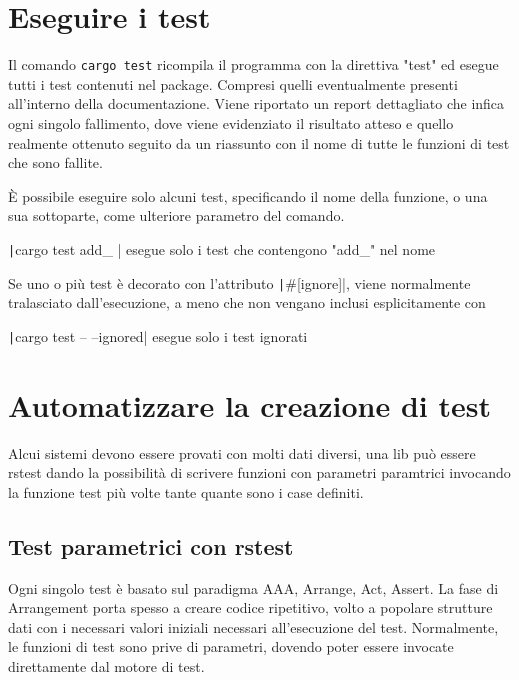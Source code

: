 \section{Eseguire i test}

Il comando \verb|cargo test| ricompila il programma con la direttiva "test" ed esegue
tutti i test contenuti nel package. Compresi quelli eventualmente presenti all'interno
della documentazione.
Viene riportato un report dettagliato che infica ogni singolo fallimento, dove
viene evidenziato il risultato atteso e quello realmente ottenuto seguito da un
riassunto con il nome di tutte le funzioni di test che sono fallite.

È possibile eseguire solo alcuni test, specificando il nome della funzione, o una sua
sottoparte, come ulteriore parametro del comando.

\begin{center}
  \texttt|cargo test add_ |  esegue solo i test che contengono "add\_" nel nome
\end{center}

Se uno o più test è decorato con l'attributo \texttt|#[ignore]|, viene
normalmente tralasciato dall'esecuzione, a meno che non vengano inclusi esplicitamente con
\begin{center}
  \texttt|cargo test -- --ignored|  esegue solo i test ignorati
\end{center}


\section{Automatizzare la creazione di test}
Alcui sistemi devono essere provati con molti dati diversi, una lib può essere
rstest dando la possibilità di scrivere funzioni con parametri paramtrici
invocando la funzione test più volte tante quante sono i case definiti.


\subsection{Test parametrici con rstest}

Ogni singolo test è basato sul paradigma AAA, Arrange, Act, Assert. La fase di
Arrangement porta spesso a creare codice ripetitivo, volto a popolare strutture
dati con i necessari valori iniziali necessari all'esecuzione del test.
Normalmente, le funzioni di test sono prive di parametri, dovendo poter essere
invocate direttamente dal motore di test.

